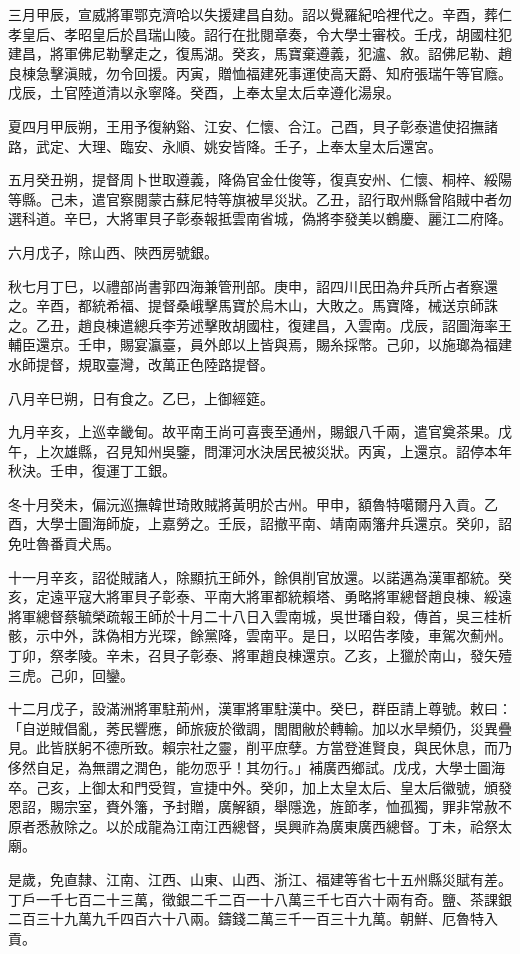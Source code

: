 \begin{pinyinscope}
三月甲辰，宣威將軍鄂克濟哈以失援建昌自劾。詔以覺羅紀哈裡代之。辛酉，葬仁孝皇后、孝昭皇后於昌瑞山陵。詔行在批閱章奏，令大學士審校。壬戌，胡國柱犯建昌，將軍佛尼勒擊走之，復馬湖。癸亥，馬寶棄遵義，犯瀘、敘。詔佛尼勒、趙良棟急擊滇賊，勿令回援。丙寅，贈恤福建死事運使高天爵、知府張瑞午等官廕。戊辰，土官陸道清以永寧降。癸酉，上奉太皇太后幸遵化湯泉。

夏四月甲辰朔，王用予復納谿、江安、仁懷、合江。己酉，貝子彰泰遣使招撫諸路，武定、大理、臨安、永順、姚安皆降。壬子，上奉太皇太后還宮。

五月癸丑朔，提督周卜世取遵義，降偽官金仕俊等，復真安州、仁懷、桐梓、綏陽等縣。己未，遣官察閱蒙古蘇尼特等旗被旱災狀。乙丑，詔行取州縣曾陷賊中者勿選科道。辛巳，大將軍貝子彰泰報抵雲南省城，偽將李發美以鶴慶、麗江二府降。

六月戊子，除山西、陜西房號銀。

秋七月丁巳，以禮部尚書郭四海兼管刑部。庚申，詔四川民田為弁兵所占者察還之。辛酉，都統希福、提督桑峨擊馬寶於烏木山，大敗之。馬寶降，械送京師誅之。乙丑，趙良棟遣總兵李芳述擊敗胡國柱，復建昌，入雲南。戊辰，詔圖海率王輔臣還京。壬申，賜宴瀛臺，員外郎以上皆與焉，賜糸採幣。己卯，以施瑯為福建水師提督，規取臺灣，改萬正色陸路提督。

八月辛巳朔，日有食之。乙巳，上御經筵。

九月辛亥，上巡幸畿甸。故平南王尚可喜喪至通州，賜銀八千兩，遣官奠茶果。戊午，上次雄縣，召見知州吳鑒，問渾河水決居民被災狀。丙寅，上還京。詔停本年秋決。壬申，復運丁工銀。

冬十月癸未，偏沅巡撫韓世琦敗賊將黃明於古州。甲申，額魯特噶爾丹入貢。乙酉，大學士圖海師旋，上嘉勞之。壬辰，詔撤平南、靖南兩籓弁兵還京。癸卯，詔免吐魯番貢犬馬。

十一月辛亥，詔從賊諸人，除顯抗王師外，餘俱削官放還。以諾邁為漢軍都統。癸亥，定遠平寇大將軍貝子彰泰、平南大將軍都統賴塔、勇略將軍總督趙良棟、綏遠將軍總督蔡毓榮疏報王師於十月二十八日入雲南城，吳世璠自殺，傳首，吳三桂析骸，示中外，誅偽相方光琛，餘黨降，雲南平。是日，以昭告孝陵，車駕次薊州。丁卯，祭孝陵。辛未，召貝子彰泰、將軍趙良棟還京。乙亥，上獵於南山，發矢殪三虎。己卯，回鑾。

十二月戊子，設滿洲將軍駐荊州，漢軍將軍駐漢中。癸巳，群臣請上尊號。敕曰：「自逆賊倡亂，莠民響應，師旅疲於徵調，閭閻敝於轉輸。加以水旱頻仍，災異疊見。此皆朕躬不德所致。賴宗社之靈，削平庶孽。方當登進賢良，與民休息，而乃侈然自足，為無謂之潤色，能勿恧乎！其勿行。」補廣西鄉試。戊戌，大學士圖海卒。己亥，上御太和門受賀，宣捷中外。癸卯，加上太皇太后、皇太后徽號，頒發恩詔，賜宗室，賚外籓，予封贈，廣解額，舉隱逸，旌節孝，恤孤獨，罪非常赦不原者悉赦除之。以於成龍為江南江西總督，吳興祚為廣東廣西總督。丁未，祫祭太廟。

是歲，免直隸、江南、江西、山東、山西、浙江、福建等省七十五州縣災賦有差。丁戶一千七百二十三萬，徵銀二千二百一十八萬三千七百六十兩有奇。鹽、茶課銀二百三十九萬九千四百六十八兩。鑄錢二萬三千一百三十九萬。朝鮮、厄魯特入貢。


\end{pinyinscope}